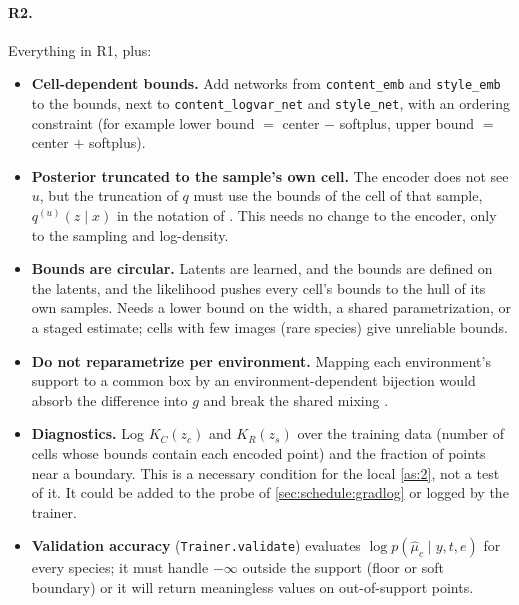 \paragraph{R2.} Everything in R1, plus:
\begin{itemize}[leftmargin=1.5em]
\item \textbf{Cell-dependent bounds.} Add networks from \texttt{content\_emb} and \texttt{style\_emb} to the
      bounds, next to \texttt{content\_logvar\_net} and \texttt{style\_net}, with an ordering constraint
      (for example lower bound $=$ center $-$ softplus, upper bound $=$ center $+$ softplus).
\item \textbf{Posterior truncated to the sample's own cell.} The encoder does not see $u$, but the truncation
      of $q$ must use the bounds of the cell of that sample, $q^{(u)}(z\mid x)$ in the notation of
      \cite{ng2025}. This needs no change to the encoder, only to the sampling and log-density.
\item \textbf{Bounds are circular.} Latents are learned, and the bounds are defined on the latents, and the
      likelihood pushes every cell's bounds to the hull of its own samples. Needs a lower bound on the width, a
      shared parametrization, or a staged estimate; cells with few images (rare species) give unreliable
      bounds.
\item \textbf{Do not reparametrize per environment.} Mapping each environment's support to a common box by an
      environment-dependent bijection would absorb the difference into $g$ and break the shared mixing
      .
\item \textbf{Diagnostics.} Log $K_C(z_c)$ and $K_R(z_s)$ over the training data (number of cells whose bounds
      contain each encoded point) and the fraction of points near a boundary. This is a necessary condition
      for the local \cref{as:2}, not a test of it. It could be added to the probe of \cref{sec:schedule:gradlog}
      or logged by the trainer.
\item \textbf{Validation accuracy} (\texttt{Trainer.validate}) evaluates $\log p(\hat\mu_c\mid y,t,e)$ for every
      species; it must handle $-\infty$ outside the support (floor or soft boundary) or it will return
      meaningless values on out-of-support points.
\end{itemize}

